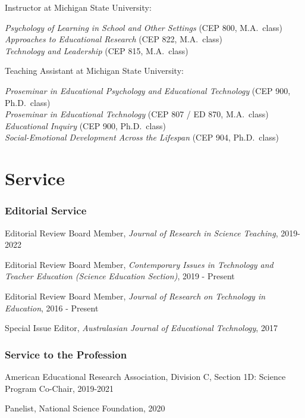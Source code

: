\documentclass[
  11pt,
]{article}
\begin{document}
Instructor at Michigan State University:

\emph{Psychology of Learning in School and Other Settings} (CEP 800,
M.A.~class)\\
\emph{Approaches to Educational Research} (CEP 822, M.A.~class)\\
\emph{Technology and Leadership} (CEP 815, M.A.~class)

Teaching Assistant at Michigan State University:

\emph{Proseminar in Educational Psychology and Educational Technology}
(CEP 900, Ph.D.~class)\\
\emph{Proseminar in Educational Technology} (CEP 807 / ED 870,
M.A.~class)\\
\emph{Educational Inquiry} (CEP 900, Ph.D.~class)\\
\emph{Social-Emotional Development Across the Lifespan} (CEP 904,
Ph.D.~class)

\hypertarget{service}{%
\section{Service}\label{service}}

\hypertarget{editorial-service}{%
\subsubsection{Editorial Service}\label{editorial-service}}

Editorial Review Board Member, \emph{Journal of Research in Science
Teaching}, 2019-2022

Editorial Review Board Member, \emph{Contemporary Issues in Technology
and Teacher Education (Science Education Section)}, 2019 - Present

Editorial Review Board Member, \emph{Journal of Research on Technology
in Education}, 2016 - Present

Special Issue Editor, \emph{Australasian Journal of Educational
Technology}, 2017

\hypertarget{service-to-the-profession}{%
\subsubsection{Service to the
Profession}\label{service-to-the-profession}}

American Educational Research Association, Division C, Section 1D:
Science Program Co-Chair, 2019-2021

Panelist, National Science Foundation, 2020
\end{document}
